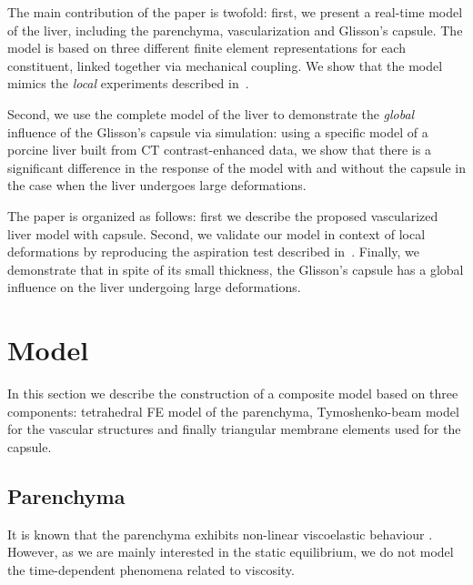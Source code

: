 \documentclass[final,3p,times,twocolumn]{elsarticle}
\begin{document}
The main contribution of the paper is twofold: first, we present a real-time model of the liver, including
the parenchyma, vascularization and Glisson's capsule. The model is based on three different finite element representations for each constituent,
linked together via mechanical coupling. We show that the model mimics the \emph{local} experiments described in~\cite{Hollenstein2006}.
 
Second, we use the complete model of the liver to demonstrate the \emph{global} influence of the Glisson's
capsule via simulation: using a specific model of a porcine liver built from CT contrast-enhanced data, we show that there is a significant 
difference in the response of the model with and without the capsule in the case when the liver undergoes large deformations. 

The paper is organized as follows: first we describe the proposed vascularized
liver model with capsule. Second, we validate our model in context of local deformations by reproducing the aspiration test 
described in~\cite{Hollenstein2006}. Finally, we demonstrate that in spite of its small thickness, the Glisson's 
capsule has a global influence on the liver undergoing large deformations. 



\section{Model} %

In this section we describe the construction of a composite model
based on three components: tetrahedral FE model of the 
parenchyma, Tymoshenko-beam model for the vascular structures and finally 
triangular membrane elements used for the capsule.

\subsection{Parenchyma} %

It is known that the parenchyma exhibits non-linear viscoelastic behaviour
\cite{Marchesseau2010,Gao2009}.
However, as we are mainly interested in the static equilibrium, we do not model the time-dependent
phenomena related to viscosity.

\end{document}
